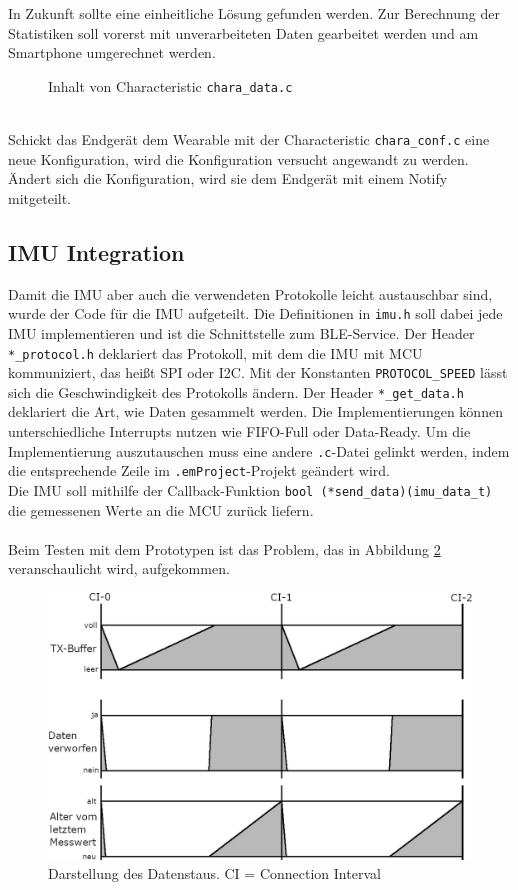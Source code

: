 In Zukunft sollte eine einheitliche Lösung gefunden werden.
Zur Berechnung der Statistiken soll vorerst mit unverarbeiteten Daten gearbeitet werden und am Smartphone umgerechnet werden.
\begin{figure}[hbtp]
	
	\caption{Inhalt von Characteristic \texttt{chara\_data.c}}
	\label{lst:imuData}
\end{figure}\\
Schickt das Endgerät dem Wearable mit der Characteristic \texttt{chara\_conf.c} eine neue Konfiguration, wird die Konfiguration versucht angewandt zu werden.
Ändert sich die Konfiguration, wird sie dem Endgerät mit einem Notify mitgeteilt.

\subsection{IMU Integration}
Damit die IMU aber auch die verwendeten Protokolle leicht austauschbar sind, wurde der Code für die IMU aufgeteilt.
Die Definitionen in \texttt{imu.h} soll dabei jede IMU implementieren und ist die Schnittstelle zum BLE-Service.
Der Header \texttt{*\_protocol.h} deklariert das Protokoll, mit dem die IMU mit MCU kommuniziert, das heißt SPI oder I2C.
Mit der Konstanten \texttt{PROTOCOL\_SPEED} lässt sich die Geschwindigkeit des Protokolls ändern.
Der Header \texttt{*\_get\_data.h} deklariert die Art, wie Daten gesammelt werden.
Die Implementierungen können unterschiedliche Interrupts nutzen wie FIFO-Full oder Data-Ready.
Um die Implementierung auszutauschen muss eine andere \texttt{.c}-Datei gelinkt werden, indem die entsprechende Zeile im \texttt{.emProject}-Projekt geändert wird.\\
Die IMU soll mithilfe der Callback-Funktion \texttt{bool (*send\_data)(imu\_data\_t)} die gemessenen Werte an die MCU zurück liefern.\\\\
Beim Testen mit dem Prototypen ist das Problem, das in Abbildung \ref{fig:daten_vorher} veranschaulicht wird, aufgekommen.
\begin{figure}[!hbtp]
	\centering
	\includegraphics[width=0.76\linewidth]{res/datenVorher.jpg}
	\caption{Darstellung des Datenstaus. CI = Connection Interval}
	\label{fig:daten_vorher}
\end{figure}
